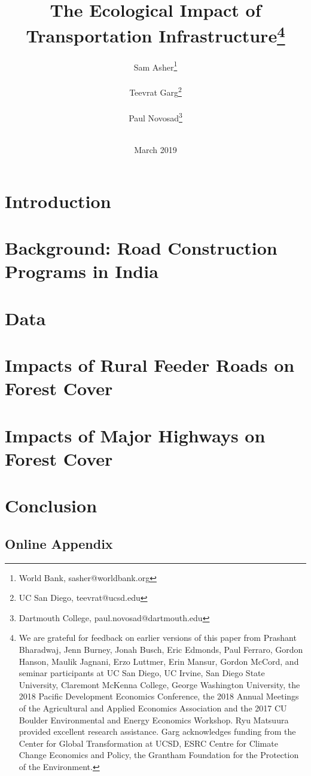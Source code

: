 \documentclass[12pt,letterpaper]{article}
\title{The Ecological Impact of Transportation
  Infrastructure\thanks{We are grateful for feedback on earlier
    versions of this paper from Prashant Bharadwaj, Jenn Burney, Jonah Busch, Eric
    Edmonds, Paul
    Ferraro, Gordon Hanson, Maulik Jagnani, Erzo Luttmer, Erin Mansur,
    Gordon McCord, and
    seminar participants at UC San Diego, UC Irvine, San Diego State University, Claremont McKenna College, George Washington University, the 2018 Pacific Development Economics Conference, the 2018 Annual Meetings of the Agricultural and Applied Economics Association and the 2017 CU Boulder Environmental and Energy
    Economics Workshop. Ryu Matsuura provided excellent research assistance. Garg acknowledges funding from the Center for Global Transformation at UCSD, ESRC
Centre for Climate Change Economics and Policy, the Grantham Foundation for the Protection of the Environment. }}
\author{Sam Asher\thanks{World Bank,
    sasher@worldbank.org} \\ \\
  Teevrat Garg\thanks{UC San Diego, teevrat@ucsd.edu} \\ \\ 
  Paul Novosad\thanks{Dartmouth College, paul.novosad@dartmouth.edu}
  \\ \\ }
\begin{document}
\date{March 2019}
\maketitle
\thispagestyle{empty}

\begin{abstract}



\end{abstract}

\newpage
\clearpage
\setcounter{page}{1}
\doublespacing

\section{Introduction}
\label{sec:intro}


\section{Background: Road Construction Programs in India}
\label{sec:bg}


\section{Data}
\label{sec:data}


\section{Impacts of Rural Feeder Roads on Forest Cover}
\label{sec:rural}


\section{Impacts of Major Highways on Forest Cover}
\label{sec:highway}


\section{Conclusion}
\label{sec:conclusion}


\begin{appendix}

\newpage
\singlespace






\section{Online Appendix} 

\setcounter{table}{0}
\renewcommand{\thetable}{A\arabic{table}}
\setcounter{figure}{0}
\renewcommand{\thefigure}{A\arabic{figure}}



\end{appendix}
\end{document}
